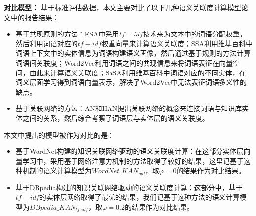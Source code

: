 \textbf{对比模型：}
基于标准评估数据，本文主要对比了以下几种语义关联度计算模型论文中的报告结果：
\begin{itemize}
    \item 基于共现原则的方法：ESA\cite{aaai/StrubeP06}中采用$tf-idf$技术来为文本中的词语分配权重，然后利用词语对应的$tf-idf$权重向量来计算语义关联度；SSA\cite{aaai/HassanM11}利用维基百科中词语上下文中的实体信息为词语构建语义画像，然后通过基于规则的方法计算词语间关联度；Word2Vec\cite{corr/Mikolov13}利用词语之间的共现信息来将词语表征在向量空间，由此来计算语义关联度；SaSA\cite{aaai/WuG15}利用维基百科中词语对应的不同实体，在词义层面学习得到词语向量表示，解决了Word2Vec中无法表征词语多义性的缺点。
    \item 基于关联网络的方法：AN\cite{aaai/ZhangZH15}和HAN\cite{aaai/GongXH18}提出关联网络的概念来连接词语与知识库实体之间的关系，然后综合考察了词语层与实体层的语义关联度。
\end{itemize}

\noindent 本文中提出的模型被作为对比的是：
\begin{itemize}
    \item 基于WordNet构建的知识关联网络驱动的语义关联度计算：在这部分实体层向量学习中，采用基于网络注意力机制的方法取得了较好的结果，这里记基于这种机制的语义计算模型为$WordNet\_KAN_{gat}$，取$\varphi=0$的结果作为对比结果。
    \item 基于DBpedia构建的知识关联网络驱动的语义关联度计算：这部分中，基于$tf-idf$的实体层网络取得了最优的结果，我们记基于这种方法的语义计算模型为$DBpedia\_KAN_{tf\_idf}$，取$\varphi=0.2$的结果作为对比结果。
\end{itemize}


